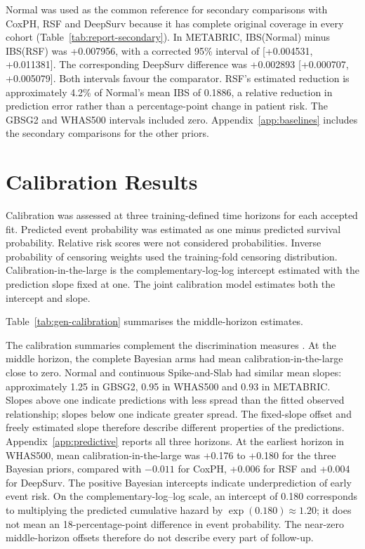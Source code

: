Normal was used as the common reference for secondary comparisons with CoxPH, RSF and DeepSurv because it has complete original coverage in every cohort (Table~\ref{tab:report-secondary}). In METABRIC, IBS(Normal) minus IBS(RSF) was +0.007956, with a corrected 95\% interval of [+0.004531, +0.011381]. The corresponding DeepSurv difference was +0.002893 [+0.000707, +0.005079]. Both intervals favour the comparator. RSF's estimated reduction is approximately 4.2\% of Normal's mean IBS of 0.1886, a relative reduction in prediction error rather than a percentage-point change in patient risk. The GBSG2 and WHAS500 intervals included zero. Appendix~\ref{app:baselines} includes the secondary comparisons for the other priors.



\section{Calibration Results}\label{calibration-results}

Calibration was assessed at three training-defined time horizons for each accepted fit. Predicted event probability was estimated as one minus predicted survival probability. Relative risk scores were not considered probabilities. Inverse probability of censoring weights used the training-fold censoring distribution. Calibration-in-the-large is the complementary-log-log intercept estimated with the prediction slope fixed at one. The joint calibration model estimates both the intercept and slope.

Table~\ref{tab:gen-calibration} summarises the middle-horizon estimates.



The calibration summaries complement the discrimination measures \cite{ref59,ref84}. At the middle horizon, the complete Bayesian arms had mean calibration-in-the-large close to zero. Normal and continuous Spike-and-Slab had similar mean slopes: approximately 1.25 in GBSG2, 0.95 in WHAS500 and 0.93 in METABRIC. Slopes above one indicate predictions with less spread than the fitted observed relationship; slopes below one indicate greater spread. The fixed-slope offset and freely estimated slope therefore describe different properties of the predictions. Appendix~\ref{app:predictive} reports all three horizons. At the earliest horizon in WHAS500, mean calibration-in-the-large was +0.176 to +0.180 for the three Bayesian priors, compared with $-0.011$ for CoxPH, +0.006 for RSF and +0.004 for DeepSurv. The positive Bayesian intercepts indicate underprediction of early event risk. On the complementary-log--log scale, an intercept of 0.180 corresponds to multiplying the predicted cumulative hazard by $\exp(0.180)\approx1.20$; it does not mean an 18-percentage-point difference in event probability. The near-zero middle-horizon offsets therefore do not describe every part of follow-up.

